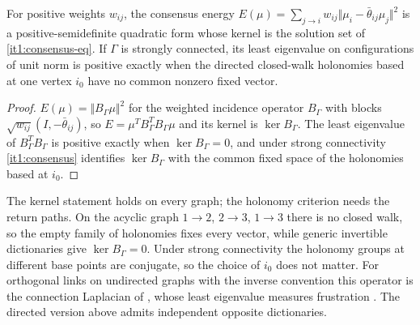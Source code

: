 For positive weights $w_{ij}$, the consensus energy $E(\mu)=\sum_{j\to i}w_{ij}\Vert\mu_i-\bar\theta_{ij}\mu_j\Vert^2$ is a positive-semidefinite quadratic form whose kernel is the solution set of \cref{it1:consensus-eq}. If $\Gamma$ is strongly connected, its least eigenvalue on configurations of unit norm is positive exactly when the directed closed-walk holonomies based at one vertex $i_0$ have no common nonzero fixed vector.
\begin{proof}
$E(\mu)=\Vert B_\Gamma\mu\Vert^2$ for the weighted incidence operator $B_\Gamma$ with blocks $\sqrt{w_{ij}}(I,-\bar\theta_{ij})$, so $E=\mu^TB_\Gamma^TB_\Gamma\mu$ and its kernel is $\ker B_\Gamma$. The least eigenvalue of $B_\Gamma^TB_\Gamma$ is positive exactly when $\ker B_\Gamma=0$, and under strong connectivity \cref{it1:consensus} identifies $\ker B_\Gamma$ with the common fixed space of the holonomies based at $i_0$.
\end{proof}

The kernel statement holds on every graph; the holonomy criterion needs the return paths. On the acyclic graph $1\to2$, $2\to3$, $1\to3$ there is no closed walk, so the empty family of holonomies fixes every vector, while generic invertible dictionaries give $\ker B_\Gamma=0$. Under strong connectivity the holonomy groups at different base points are conjugate, so the choice of $i_0$ does not matter. For orthogonal links on undirected graphs with the inverse convention this operator is the connection Laplacian of \citet{SingerWu2012}, whose least eigenvalue measures frustration \citep{BandeiraSingerSpielman2013}. The directed version above admits independent opposite dictionaries.

